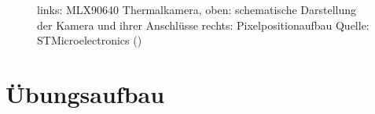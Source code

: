 \documentclass[
  11pt,
  a4paperpaper,
  oneside, openany  ,captions=tableheading
]{scrbook}
\theoremstyle{definition}
\theoremstyle{remark}
\begin{document}
\begin{figure}


\caption{\label{fig-MLX90640}links: MLX90640 Thermalkamera, oben:
schematische Darstellung der Kamera und ihrer Anschlüsse rechts:
Pixelpositionaufbau Quelle: STMicroelectronics
()}

\end{figure}%

\section{Übungsaufbau}\label{uxfcbungsaufbau-4}
\end{document}
